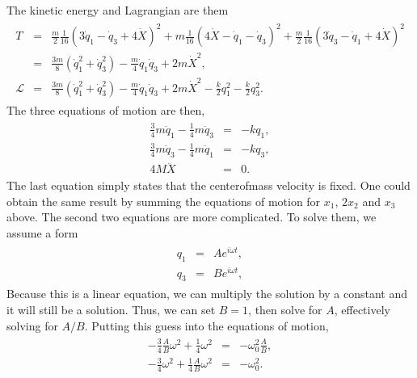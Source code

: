 \documentclass[letterpaper,10pt,english]{sphinxmanual}
\begin{document}
The kinetic energy and Lagrangian are them
\begin{equation*}
\begin{split}
\begin{eqnarray*}
T&=&\frac{m}{2}\frac{1}{16}(3\dot{q}_1-\dot{q}_3+4\dot{X})^2
+m\frac{1}{16}(4\dot{X}-\dot{q}_1-\dot{q}_3)^2
+\frac{m}{2}\frac{1}{16}(3\dot{q}_3-\dot{q}_1+4\dot{X})^2\\
&=&\frac{3m}{8}(\dot{q}_1^2+\dot{q}_3^2)-\frac{m}{4}\dot{q}_1\dot{q}_3
+2m\dot{X}^2,\\
\mathcal{L}&=&\frac{3m}{8}(\dot{q}_1^2+\dot{q}_3^2)-\frac{m}{4}\dot{q}_1\dot{q}_3
+2m\dot{X}^2-\frac{k}{2}q_1^2-\frac{k}{2}q_3^2.
\end{eqnarray*}
\end{split}
\end{equation*}
The three equations of motion are then,
\begin{equation*}
\begin{split}
\begin{eqnarray*}
\frac{3}{4}m\ddot{q}_1-\frac{1}{4}m\ddot{q}_3&=&-kq_1,\\
\frac{3}{4}m\ddot{q}_3-\frac{1}{4}m\ddot{q}_1&=&-kq_3,\\
4M\ddot{X}&=&0.
\end{eqnarray*}
\end{split}
\end{equation*}
The last equation simply states that the center\sphinxhyphen{}of\sphinxhyphen{}mass velocity is
fixed. One could obtain the same result by summing the equations of
motion for \(x_1\), \(2x_2\) and \(x_3\) above. The second two equations are
more complicated. To solve them, we assume a form
\begin{equation*}
\begin{split}
\begin{eqnarray*}
q_1&=&Ae^{i\omega t},\\
q_3&=&Be^{i\omega t},
\end{eqnarray*}
\end{split}
\end{equation*}
Because this is a linear equation, we can multiply the solution by a
constant and it will still be a solution. Thus, we can set \(B=1\), then
solve for \(A\), effectively solving for \(A/B\). Putting this guess into
the equations of motion,
\begin{equation*}
\begin{split}
\begin{eqnarray*}
-\frac{3}{4}\frac{A}{B}\omega^2+\frac{1}{4}\omega^2&=&-\omega_0^2\frac{A}{B},\\
-\frac{3}{4}\omega^2+\frac{1}{4}\frac{A}{B}\omega^2&=&-\omega_0^2.
\end{eqnarray*}
\end{split}
\end{equation*}
\end{document}
